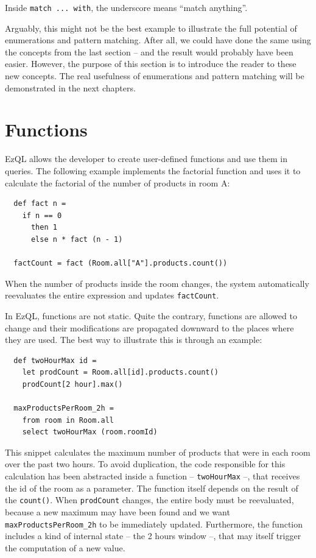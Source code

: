 Inside \verb=match ... with=, the underscore means ``match anything''.

Arguably, this might not be the best example to illustrate the full
potential of enumerations and pattern matching. After all, we could
have done the same using the concepts from the last section -- and the
result would probably have been easier. However, the purpose of this
section is to introduce the reader to these new concepts. The real
usefulness of enumerations and pattern matching will be demonstrated
in the next chapters.

\section{Functions}
\label{sec:functions}

EzQL allows the developer to create user-defined functions and use
them in queries. The following example implements the factorial
function and uses it to calculate the factorial of the number of
products in room A:

\begin{lstlisting}
  def fact n =
    if n == 0
      then 1
      else n * fact (n - 1)

  factCount = fact (Room.all["A"].products.count())
\end{lstlisting}

When the number of products inside the room changes, the system
automatically reevaluates the entire expression and updates
\verb=factCount=.

In EzQL, functions are not static. Quite the contrary, functions are
allowed to change and their modifications are propagated downward to
the places where they are used. The best way to illustrate this is
through an example:

\begin{lstlisting}
  def twoHourMax id =
    let prodCount = Room.all[id].products.count()
    prodCount[2 hour].max()

  maxProductsPerRoom_2h =
    from room in Room.all
    select twoHourMax (room.roomId)
\end{lstlisting}

This snippet calculates the maximum number of products that were in
each room over the past two hours. To avoid duplication, the code
responsible for this calculation has been abstracted inside a function
-- \verb=twoHourMax= --, that receives the id of the room as a
parameter. The function itself depends on the result of the
\verb=count()=. When \verb=prodCount= changes, the entire body must be
reevaluated, because a new maximum may have been found and we want
\verb=maxProductsPerRoom_2h= to be immediately updated. Furthermore,
the function includes a kind of internal state -- the 2 hours window
--, that may itself trigger the computation of a new value.

